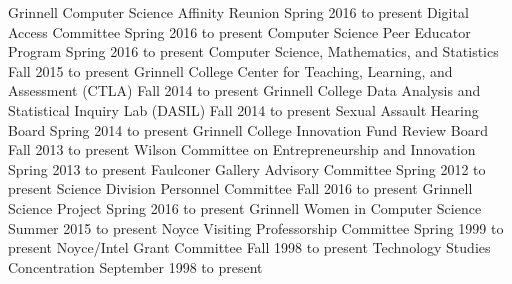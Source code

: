 \begin{cventries}
\end{cventries}


\begin{cventries}


  {Grinnell Computer Science Affinity Reunion}
  {Spring 2016 to present}
  {Digital Access Committee}
  {Spring 2016 to present}
  {Computer Science Peer Educator Program}
  {Spring 2016 to present}
  {Computer Science, Mathematics, and Statistics}
  {Fall 2015 to present}
  {Grinnell College Center for Teaching, Learning, and Assessment (CTLA)}
  {Fall 2014 to present}
  {Grinnell College Data Analysis and Statistical Inquiry Lab (DASIL)}
  {Fall 2014 to present}
  {Sexual Assault Hearing Board}
  {Spring 2014 to present}
  {Grinnell College Innovation Fund Review Board}
  {Fall 2013 to present}
  {Wilson Committee on Entrepreneurship and Innovation}
  {Spring 2013 to present}
  {Faulconer Gallery Advisory Committee}
  {Spring 2012 to present}
  {Science Division Personnel Committee}
  {Fall 2016 to present}
  {Grinnell Science Project}
  {Spring 2016 to present}
  {Grinnell Women in Computer Science}
  {Summer 2015 to present}
  {Noyce Visiting Professorship Committee}
  {Spring 1999 to present}
  {Noyce/Intel Grant Committee}
  {Fall 1998 to present}
  {Technology Studies Concentration}
  {September 1998 to present}

\vspace{1mm}



\end{cventries}
